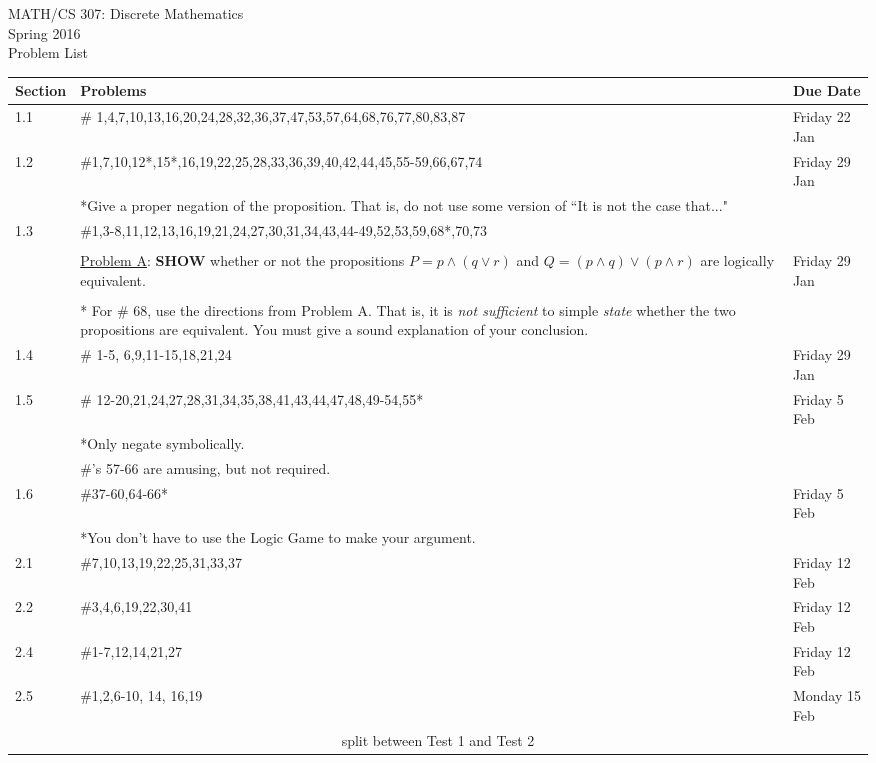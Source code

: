 \documentclass[11pt]{article}
\begin{document}
\begin{center}MATH/CS 307:  Discrete Mathematics \\ Spring 2016 \\ Problem List\end{center}

\hrulefill

\begin{tabular}{|p{1.6cm}|p{12cm}|p{3cm}|}
\hline
Section & Problems & Due Date\\
\hline \hline
1.1 & \# 1,4,7,10,13,16,20,24,28,32,36,37,47,53,57,64,68,76,77,80,83,87& Friday 22 Jan \\
\hline
1.2 & \#1,7,10,12*,15*,16,19,22,25,28,33,36,39,40,42,44,45,55-59,66,67,74 & Friday 29 Jan \\
&*Give a proper negation of the proposition. That is, do not use some version of ``It is not the case that..."&\\
\hline
1.3 & \#1,3-8,11,12,13,16,19,21,24,27,30,31,34,43,44-49,52,53,59,68*,70,73&\\
&&\\
& \underline{Problem A}: \textbf{SHOW} whether or not the propositions $P=p \wedge(q\vee r)$ and $Q=(p \wedge q) \vee (p \wedge r)$ are logically equivalent.&Friday 29 Jan\\
&&\\
& * For \# 68, use the directions from Problem A. That is, it is \emph{not sufficient} to simple \emph{state} whether the two propositions are equivalent. You must give a sound explanation of your conclusion.&\\
\hline
1.4 & \# 1-5, 6,9,11-15,18,21,24& Friday 29 Jan\\
\hline
1.5 & \# 12-20,21,24,27,28,31,34,35,38,41,43,44,47,48,49-54,55*&Friday 5 Feb\\
& *Only negate symbolically. &\\
& \#'s 57-66 are amusing, but not required. & \\
\hline
1.6 & \#37-60,64-66*&Friday 5 Feb\\
&*You don't have to use the Logic Game to make your argument.&\\
\hline
2.1 & \#7,10,13,19,22,25,31,33,37& Friday 12 Feb \\
\hline
2.2 & \#3,4,6,19,22,30,41& Friday 12 Feb\\
\hline
2.4 & \#1-7,12,14,21,27& Friday 12 Feb\\
\hline
2.5 & \#1,2,6-10, 14, 16,19& Monday 15 Feb\\
\hline
\hline
\multicolumn{3}{c}{split between Test 1 and Test 2}\\

\end{tabular}
\end{document}
